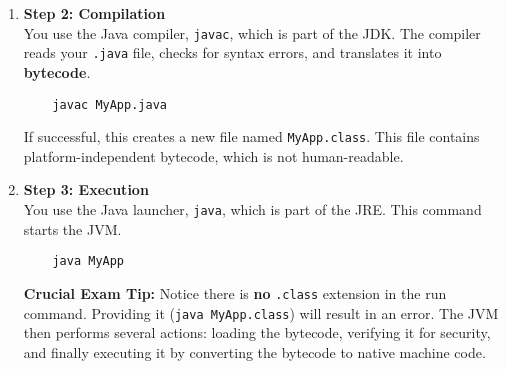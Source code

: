 \documentclass[12pt]{article}
\begin{document}
\begin{enumerate}[label=(\arabic*)]
\begin{enumerate}
    \item \textbf{Step 2: Compilation} \\
    You use the Java compiler, \texttt{javac}, which is part of the JDK. The compiler reads your \texttt{.java} file, checks for syntax errors, and translates it into \textbf{bytecode}.
    \begin{verbatim}
    javac MyApp.java
    \end{verbatim}
    If successful, this creates a new file named \texttt{MyApp.class}. This file contains platform-independent bytecode, which is not human-readable.

    \item \textbf{Step 3: Execution} \\
    You use the Java launcher, \texttt{java}, which is part of the JRE. This command starts the JVM.
    \begin{verbatim}
    java MyApp
    \end{verbatim}
    \textbf{Crucial Exam Tip:} Notice there is \textbf{no} \texttt{.class} extension in the run command. Providing it (\texttt{java MyApp.class}) will result in an error. The JVM then performs several actions: loading the bytecode, verifying it for security, and finally executing it by converting the bytecode to native machine code.
\end{enumerate}
\end{enumerate}
\end{document}
